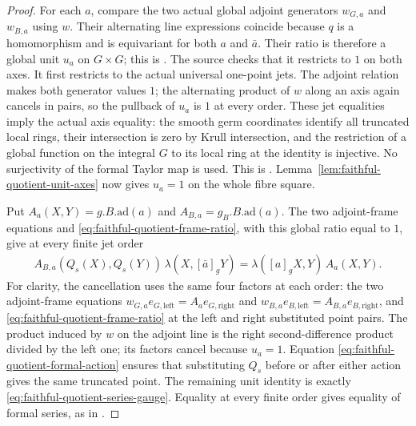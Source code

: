 \begin{proof}
For each \(a\), compare the two actual global adjoint
generators \(w_{G,a}\) and \(w_{B,a}\) using \(w\).
Their alternating line expressions coincide because \(q\)
is a homomorphism and is equivariant for both \(a\) and
\(\bar a\).  Their ratio is therefore a global unit
\(u_a\) on \(G\times G\);
this is .
The source checks that it restricts to \(1\) on both axes.
It first restricts to the actual universal one-point jets.
The adjoint relation makes both generator values \(1\);
the alternating product of \(w\) along an axis again
cancels in pairs, so the pullback of \(u_a\) is \(1\)
at every order.
These jet equalities imply the actual axis equality:
the smooth germ coordinates identify all truncated local
rings, their intersection is zero by Krull intersection,
and the restriction of a global function on the integral
\(G\) to its local ring at the identity is injective.
No surjectivity of the formal Taylor map is used.
This is .
Lemma~\ref{lem:faithful-quotient-unit-axes} now gives
\(u_a=1\) on the whole fibre square.

Put \(A_a(X,Y)=g.B.\mathrm{ad}(a)\) and
\(A_{B,a}=g_B.B.\mathrm{ad}(a)\).
The two adjoint-frame equations and
\eqref{eq:faithful-quotient-frame-ratio}, with this global
ratio equal to \(1\), give at every finite jet order
\[
 \begin{split}
 A_{B,a}(Q_s(X),Q_s(Y))\,
                    \lambda(X,[\bar a]_gY)
     =\lambda([a]_gX,Y)\,A_a(X,Y).
 \end{split}
 \tag{QL8}\label{eq:faithful-quotient-series-gauge}
\]
For clarity, the cancellation uses the same four factors
at each order: the two adjoint-frame equations
\(w_{G,a}e_{G,\mathrm{left}}=A_a e_{G,\mathrm{right}}\)
and
\(w_{B,a}e_{B,\mathrm{left}}=A_{B,a}e_{B,\mathrm{right}}\),
and \eqref{eq:faithful-quotient-frame-ratio} at the left
and right substituted point pairs.
The product induced by \(w\) on the adjoint line is the
right second-difference product divided by the left one;
its factors cancel because \(u_a=1\).
Equation \eqref{eq:faithful-quotient-formal-action} ensures
that substituting \(Q_s\) before or after either action
gives the same truncated point.
The remaining unit identity is exactly
\eqref{eq:faithful-quotient-series-gauge}.
Equality at every finite order gives equality of formal
series, as in .


\end{proof}
